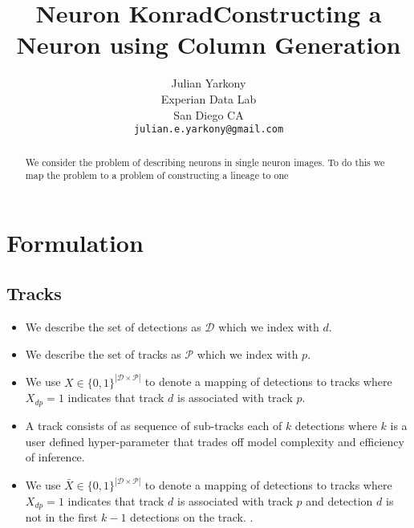 \documentclass{article}
\title{Neuron Konrad}
\title{Constructing a Neuron using Column Generation}
\author{
Julian Yarkony\\
Experian Data Lab \\%
San Diego CA \\
\texttt{julian.e.yarkony@gmail.com} 
}
\begin{document}
%
\maketitle
%
\begin{abstract}
We consider the problem of describing neurons in single neuron images.  To do this we map the problem to a problem of constructing a lineage to one %
%
%
\end{abstract}
%
\section{Formulation}
\subsection{Tracks }

\begin{itemize}
\item
We describe the set of detections as $\mathcal{D}$ which we index with $d$.  
\item 
We describe the set of tracks as $\mathcal{P}$ which we index with $p$.  
\item 
We use $X \in \{0,1\}^{|\mathcal{D}\times \mathcal{P}|}$ to denote a mapping of detections to tracks where $X_{dp}=1$ indicates that track $d$ is associated with track $p$.  
\item 
A track consists of as sequence of sub-tracks each of $k$ detections where $k$ is a user defined hyper-parameter that trades off model complexity and efficiency of inference. 
\item 
 We use $\bar{X} \in \{0,1\}^{|\mathcal{D}\times \mathcal{P}|}$ to denote a mapping of detections to tracks where $X_{dp}=1$ indicates that track $d$ is associated with track $p$ and detection $d$ is not in the first $k-1$ detections  on the track.  .
 \end{itemize}
\end{document}
